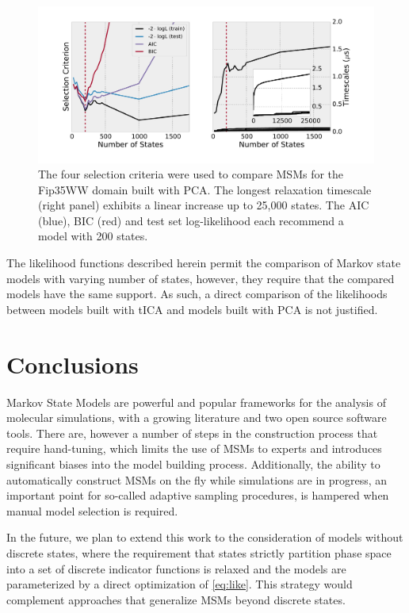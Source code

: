 \documentclass[journal=jpcbfk, layout=traditional, manuscript=article]{achemso}
\begin{document}
\begin{figure}
\centering
\includegraphics[width=6in]{figs/ww_pca/ww_pca.pdf}
\caption{The four selection criteria were used to compare MSMs for the Fip35WW domain built with PCA. The longest relaxation timescale (right panel) exhibits a linear increase up to 25,000 states. The AIC (blue), BIC (red) and test set log-likelihood each recommend a model with 200 states.\label{fig:ww-pca}} 
\end{figure}

The likelihood functions described herein permit the comparison of Markov state models with varying number of states, however, they require that the compared models have the same support. As such, a direct comparison of the likelihoods between models built with tICA and models built with PCA is not justified.

\section{Conclusions}

Markov State Models are powerful and popular frameworks for the analysis of molecular simulations, with a growing literature and two open source software tools\cite{Beauchamp2011Msmbuilder2, Senne2012EMMA}. There are, however a number of steps in the construction process that require hand-tuning, which limits the use of MSMs to experts and introduces significant biases into the model building process. Additionally, the ability to automatically construct MSMs on the fly while simulations are in progress, an important point for so-called adaptive sampling procedures\cite{Bowman2010Enhanced}, is hampered when manual model selection is required. 

In the future, we plan to extend this work to the consideration of models without discrete states, where the requirement that states strictly partition phase space into a set of discrete indicator functions is relaxed and the models are parameterized by a direct optimization of \cref{eq:like}. This strategy would complement approaches that generalize MSMs beyond discrete states\cite{chiang2010markov, Noe2013Variational}.
\end{document}

